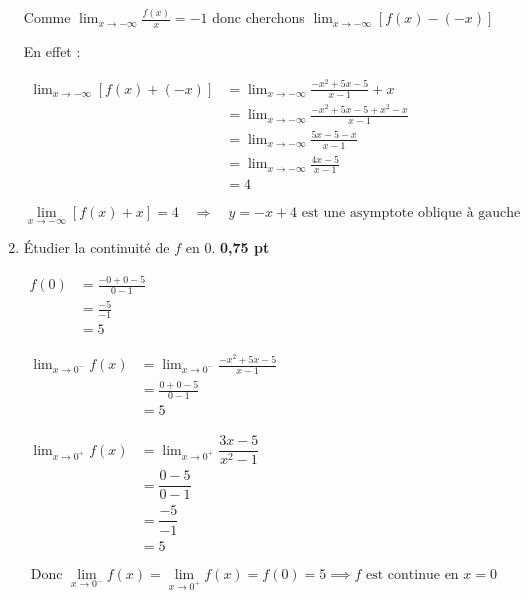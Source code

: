 \documentclass[12pt,a4paper]{article}
\begin{document}
\begin{enumerate}
Comme \( \lim_{x \to -\infty} \frac{f(x)}{x} = -1 \) donc cherchons \( \lim_{x \to -\infty} [ f(x) - (-x) ] \)

En effet :

\(
\begin{aligned}
	\lim_{x \to -\infty} [ f(x) + (-x) ] &= \lim_{x \to -\infty} \frac{-x^2 + 5x - 5}{x - 1}+x\\
														&= \lim_{x \to -\infty} \frac{-x^2 + 5x - 5+x^{2}-x}{x - 1}\\
														&= \lim_{x \to -\infty} \frac{5x - 5-x}{x - 1}\\
														&= \lim_{x \to -\infty} \frac{4x - 5}{x - 1}\\
														&=4
\end{aligned}
\) 

\begin{resultbox}
\[
\lim_{x \to -\infty} [f(x) + x] = 4
\quad \Rightarrow \quad \boxed{y = -x + 4 \text{ est une asymptote oblique à gauche}}
\]
\end{resultbox}    
    
    \item Étudier la continuité de \( f \) en \( 0 \). \hfill \textbf{0{,}75 pt}

\(
\begin{aligned}
f(0) &= \frac{-0 + 0 - 5}{0 - 1}\\
		 &= \frac{-5}{-1}\\
		 &= 5
\end{aligned}
\)

\(
\begin{aligned}
\lim_{x \to 0^-} f(x) &= \lim_{x \to 0^-} \frac{-x^2 + 5x - 5}{x - 1}\\
											&= \frac{0 + 0 - 5}{0 - 1}\\
											&= 5
\end{aligned}
\)

\(
\begin{aligned}
\lim_{x \to 0^+} f(x) &= \lim_{x \to 0^+} \dfrac{3x - 5}{x^2 - 1}\\
											&= \dfrac{0 - 5}{0 - 1}\\ 
											&= \dfrac{-5}{-1}\\ 
											&= 5 
\end{aligned}
\)

\begin{resultbox}
\[
\boxed{\text{Donc } \lim_{x \to 0^-} f(x) = \lim_{x \to 0^+} f(x) = f(0) = 5 \implies f \text{ est continue en } x = 0}
\]
\end{resultbox}


\end{enumerate}
\end{document}
